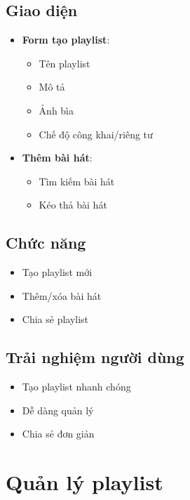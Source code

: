 \documentclass{article}
\begin{document}
\subsection{Giao diện}
\begin{itemize}
    \item \textbf{Form tạo playlist}:
    \begin{itemize}
        \item Tên playlist
        \item Mô tả
        \item Ảnh bìa
        \item Chế độ công khai/riêng tư
    \end{itemize}
    \item \textbf{Thêm bài hát}:
    \begin{itemize}
        \item Tìm kiếm bài hát
        \item Kéo thả bài hát
    \end{itemize}
\end{itemize}

\subsection{Chức năng}
\begin{itemize}
    \item Tạo playlist mới
    \item Thêm/xóa bài hát
    \item Chia sẻ playlist
\end{itemize}

\subsection{Trải nghiệm người dùng}
\begin{itemize}
    \item Tạo playlist nhanh chóng
    \item Dễ dàng quản lý
    \item Chia sẻ đơn giản
\end{itemize}

\section{Quản lý playlist}
\end{document}
